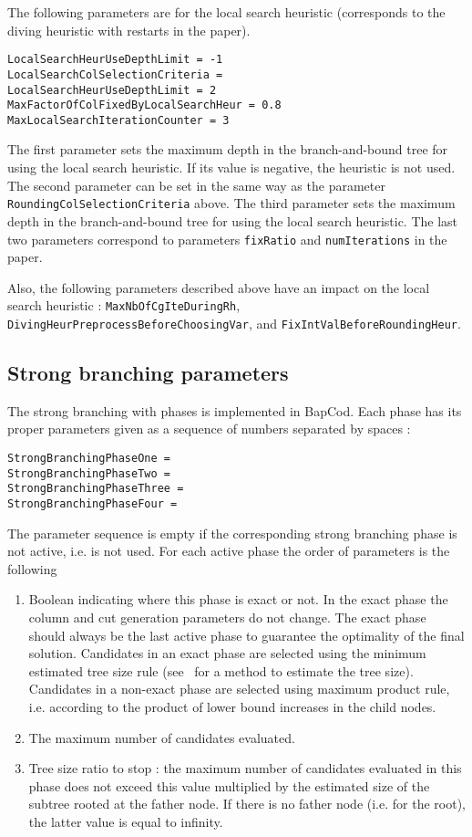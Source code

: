 \documentclass[10pt,a4paper]{article}
\begin{document}
The following parameters are for the local search heuristic (corresponds to the diving heuristic with restarts in
the paper).
\begin{lstlisting}
LocalSearchHeurUseDepthLimit = -1
LocalSearchColSelectionCriteria =
LocalSearchHeurUseDepthLimit = 2
MaxFactorOfColFixedByLocalSearchHeur = 0.8
MaxLocalSearchIterationCounter = 3
\end{lstlisting}
The first parameter sets the maximum depth in the branch-and-bound tree for using the local search heuristic. If its
value is negative, the heuristic is not used. The second parameter can be set in the same way as the parameter
\verb+RoundingColSelectionCriteria+ above. The third parameter sets the maximum depth in the branch-and-bound tree for
using the local search heuristic. The last two parameters correspond to parameters \verb+fixRatio+ and
\verb+numIterations+ in the paper.

Also, the following parameters described above have an impact on the local search heuristic :
\verb+MaxNbOfCgIteDuringRh+, \verb+DivingHeurPreprocessBeforeChoosingVar+, and \verb+FixIntValBeforeRoundingHeur+.

\subsection{Strong branching parameters}
\label{sec:strongbranchingconfig}

The strong branching with phases is implemented in BapCod. Each phase has its proper parameters
given as a sequence of numbers separated by spaces :
\begin{lstlisting}
StrongBranchingPhaseOne =
StrongBranchingPhaseTwo =
StrongBranchingPhaseThree =
StrongBranchingPhaseFour =
\end{lstlisting}
The parameter sequence is empty if the corresponding strong branching phase is not active,
i.e. is not used. For each active phase the order of parameters is the following

\begin{enumerate}
\item Boolean indicating where this phase is exact or not. In the exact phase the column and cut generation parameters
  do not change. The exact phase should always be the last active phase to guarantee the optimality of the final
  solution. Candidates in an exact phase are selected using the minimum estimated tree size rule
  (see~\cite{Kullmann:09a} for a method to estimate the tree size). Candidates in a non-exact phase are selected using
  maximum product rule, i.e. according to the product of lower bound increases in the child nodes.
\item The maximum number of candidates evaluated.
\item Tree size ratio to stop : the maximum number of candidates evaluated in this phase does not exceed this value
  multiplied by the estimated size of the subtree rooted at the father node. If there is no father node (i.e. for the
  root), the latter value is equal to infinity.
\end{enumerate}
\end{document}
